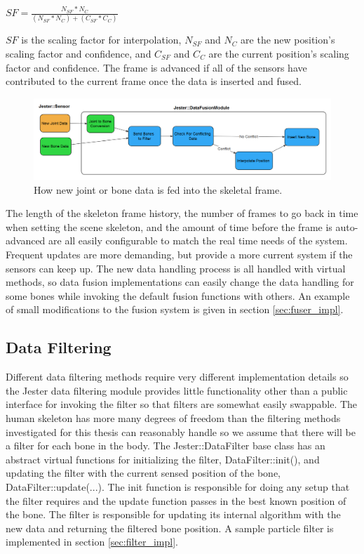 \centerline{$SF = \frac{N_{SF} * N_{C}}{(N_{SF} * N_{C}) + (C_{SF} * C_{C})}$}

$SF$ is the scaling factor for interpolation, $N_{SF}$ and $N_{C}$ are the new position's scaling factor and confidence, and $C_{SF}$ and $C_{C}$ are the current position’s scaling factor and confidence. The frame is advanced if all of the sensors have contributed to the current frame once the data is inserted and fused. 

\begin{figure}[]
\centering
\includegraphics[width=1\textwidth]{figures/insertionDataflow}
\caption{How new joint or bone data is fed into the skeletal frame.}
\label{fig:new_data_flow}
\end{figure}

The length of the skeleton frame history, the number of frames to go back in time when setting the scene skeleton, and the amount of time before the frame is auto-advanced are all easily configurable to match the real time needs of the system. Frequent updates are more demanding, but provide a more current system if the sensors can keep up. The new data handling process is all handled with virtual methods, so data fusion implementations can easily change the data handling for some bones while invoking the default fusion functions with others. An example of small modifications to the fusion system is given in section \ref{sec:fuser_impl}.
	
\subsection{Data Filtering}

Different data filtering methods require very different implementation details so the Jester data filtering module provides little functionality other than a public interface for invoking the filter so that filters are somewhat easily swappable. The human skeleton has more many degrees of freedom than the filtering methods investigated for this thesis can reasonably handle so we assume that there will be a filter for each bone in the body. The Jester::DataFilter base class has an abstract virtual functions for initializing the filter, DataFilter::init(), and updating the filter with the current sensed position of the bone, DataFilter::update(...). The init function is responsible for doing any setup that the filter requires and the update function passes in the best known position of the bone. The filter is responsible for updating its internal algorithm with the new data and returning the filtered bone position. A sample particle filter is implemented in section \ref{sec:filter_impl}.
